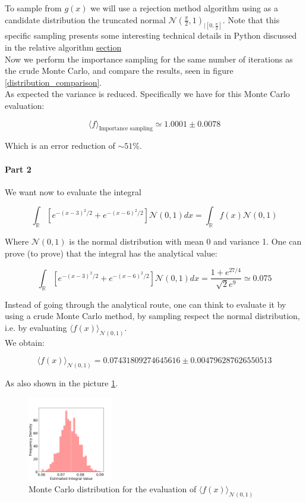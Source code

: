 To sample from $g(x)$ we will use a rejection method algorithm using as a candidate distribution the truncated normal $\mathcal{N}(\frac{\pi}{2}, 1)_{\mid [0, \frac{\pi}{2}]}$. 
Note that this specific sampling presents some interesting technical details in Python discussed in the relative algorithm \hyperref[par:detail_rejection]{section} \\
Now we perform the importance sampling for the same number of iterations as the crude Monte Carlo, and compare the results, seen in figure \ref{distribution_comparison}. \\
As expected the variance is reduced. Specifically we have for this Monte Carlo evaluation:

$$ \langle f \rangle_{\text{Importance sampling}} \simeq 1.0001 \pm 0.0078 $$

Which is an error reduction of $\sim 51 \%$.

\paragraph*{Part 2} We want now to evaluate the integral


$$\int_{\mathbb{R}}\left[ e^{-(x-3)^2/2}+e^{-(x-6)^2/2} \right] \mathcal{N}(0,1) dx = \int_{\mathbb{R}} f(x) \mathcal{N}(0,1) $$

Where $\mathcal{N}(0,1)$ is the normal distribution with mean 0 and variance 1.
One can prove (to prove) that the integral has the analytical value:

$$ \int_{\mathbb{R}}\left[ e^{-(x-3)^2/2}+e^{-(x-6)^2/2} \right] \mathcal{N}(0,1) dx = \frac{1 + e^{27/4}}{\sqrt{2} e^9} \simeq 0.075 $$

Instead of going through the analytical route, one can think to evaluate it by using a crude Monte Carlo method, by sampling respect the normal distribution, 
i.e. by evaluating $\langle f(x) \rangle_{\mathcal{N}(0,1)}$. \\
We obtain:

$$ \langle f(x) \rangle_{\mathcal{N}(0,1)} = 0.07431809274645616 \pm 0.004796287626550513 $$

As also shown in the picture \ref{crude_mc_integral2}.

\begin{figure}
  \vspace{-25pt}
  \centering
  \includegraphics[width=0.33\textwidth]{FIG/exercise_3_images/distribution_crude_mc_ex2.png}
\caption{Monte Carlo distribution for the evaluation of $\langle f(x) \rangle_{\mathcal{N}(0,1)}$}
\label{crude_mc_integral2}
\end{figure}

